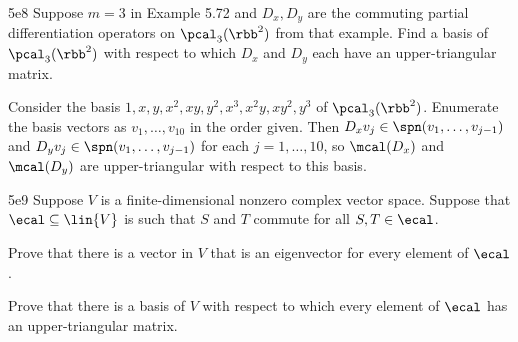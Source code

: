 \begin{exercise}{5e8}
    Suppose $m = 3$ in Example 5.72 and $D_x, D_y$ are the commuting partial differentiation operators on $\pcal_3(\rbb^2)$ from that example.
    Find a basis of $\pcal_3(\rbb^2)$ with respect to which $D_x$ and $D_y$ each have an upper-triangular matrix.
\end{exercise}

\begin{sol}
    Consider the basis $1, x, y, x^2, xy, y^2, x^3, x^2y, xy^2, y^3$ of $\pcal_3(\rbb^2)$.
    Enumerate the basis vectors as $v_1, \ldots, v_{10}$ in the order given.
    Then $D_x v_j \in \spn(v_1, \ldots, v_{j-1})$ and $D_y v_j \in \spn(v_1, \ldots, v_{j-1})$ for each $j = 1, \ldots, 10$, so $\mcal(D_x)$ and $\mcal(D_y)$ are upper-triangular with respect to this basis.
\end{sol}

\begin{exercise}{5e9}
    Suppose $V$ is a finite-dimensional nonzero complex vector space.
    Suppose that $\ecal \subseteq \lin{V}$ is such that $S$ and $T$ commute for all $S, T \in \ecal$.
    \begin{subexercises}
        \item Prove that there is a vector in $V$ that is an eigenvector for every element of $\ecal$.
        \item Prove that there is a basis of $V$ with respect to which every element of $\ecal$ has an upper-triangular matrix.
    \end{subexercises}
\end{exercise}

